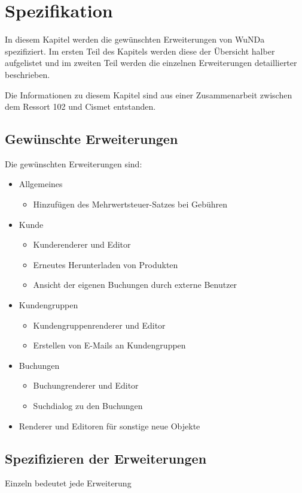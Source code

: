 \chapter{Spezifikation}
In diesem Kapitel werden die gewünschten Erweiterungen von \ac{WuNDa} spezifiziert. Im ersten Teil des Kapitels werden diese der Übersicht halber aufgelistet und im zweiten Teil werden die einzelnen Erweiterungen detaillierter beschrieben.

Die Informationen zu diesem Kapitel sind aus einer Zusammenarbeit zwischen dem Ressort 102 und Cismet entstanden. 
\section{Gewünschte Erweiterungen}
Die gewünschten Erweiterungen sind:
\begin{itemize}
	\item Allgemeines
	\begin{itemize}
    \item Hinzufügen des Mehrwertsteuer-Satzes bei Gebühren
    \end{itemize}
    \item Kunde
    \begin{itemize}
    \item Kunderenderer und Editor
    \item Erneutes Herunterladen von Produkten
    \item Ansicht der eigenen Buchungen durch externe Benutzer
    \end{itemize}
	\item Kundengruppen
	\begin{itemize}
    \item Kundengruppenrenderer und Editor
    \item Erstellen von E-Mails an Kundengruppen
    \end{itemize}
    \item Buchungen
	\begin{itemize}
    \item Buchungrenderer und Editor
    \item Suchdialog zu den Buchungen
    \end{itemize}    
	\item Renderer und Editoren für sonstige neue Objekte
\end{itemize}




\section{Spezifizieren der Erweiterungen}
Einzeln bedeutet jede Erweiterung
